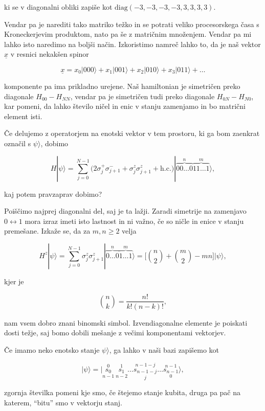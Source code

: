 \documentclass[a4 paper, 12pt]{article}
\begin{document}
ki se v diagonalni obliki zapiše kot $\text{diag}(-3, -3, -3, -3, 3, 3, 3, 3)$.

Vendar pa je narediti tako matriko težko in se potrati veliko procesorskega časa s Kroneckerjevim produktom,
nato pa še z matričnim množenjem. Vendar pa mi lahko isto naredimo na boljši način. Izkoristimo namreč lahko
to, da je naš vektor $\underline{x}$ v resnici nekakšen spinor

\[
	\underline{x} = x_0|000\rangle + x_1|001\rangle + x_2|010\rangle + x_3|011\rangle + \ldots
\]

komponente pa ima prikladno urejene. Naš hamiltonian je simetričen preko diagonale $H_{00} - H_{NN}$,
vendar pa je simetričen tudi preko diagonale $H_{0N} - H_{N0}$, kar pomeni, da lahko število ničel in
enic v stanju zamenjamo in bo matrični element isti.

Če delujemo z operatorjem na enotski vektor v tem prostoru, ki ga bom zaenkrat označil s $\psi\rangle$,
dobimo

\[
	H|\psi\rangle = \sum_{j=0}^{N-1} \big(2\sigma_j^+\sigma_{j+1}^- + \sigma^z_j\sigma^z_{j+1} + \text{h.c.}\big)
		|\overbrace{00\ldots0}^{n}\overbrace{11\ldots1}^{m}\rangle,
\]

kaj potem pravzaprav dobimo?

Poiščimo najprej diagonalni del, saj je ta lažji. Zaradi simetrije na zamenjavo $0 \leftrightarrow 1$ mora izraz imeti
isto lastnost in ni važno, če so ničle in enice v stanju premešane. Izkaže se, da za $m,n \geq 2$ velja

\[
	H^z|\psi\rangle = \sum_{j=0}^{N-1}\sigma^z_j\sigma^z_{j+1}|\overbrace{0\ldots0}^n \overbrace{1\ldots1}^m\rangle = \bigg[\binom{n}{2} + \binom{m}{2} - mn\bigg]|\psi\rangle,
\]

kjer je

\[
	\binom{n}{k} = \frac{n!}{k!(n-k)!},
\]

nam vsem dobro znani binomski simbol. Izvendiagonalne elemente je poiskati dosti težje, saj bomo dobili mešanje
z večimi komponentami vektorjev.

Če imamo neko enotsko stanje $\psi\rangle$, ga lahko v naši bazi zapišemo kot

\[
	|\psi\rangle = |\overset{0}{\underset{n-1}{s_0}}\ \overset{1}{\underset{n-2}{s_1}}\ldots
		\overset{n-1-j}{\underset{j}{s_{n-1-j}}}\ldots\overset{n-1}{\underset{0}{s_{n-1}}}\rangle,
\]

zgornja številka pomeni kje smo, če štejemo stanje kubita, druga pa pač na katerem, "`bitu"' smo v vektorju stanj.
\end{document}
